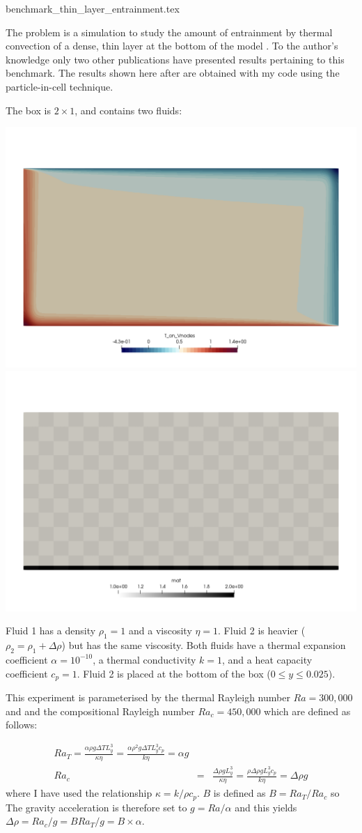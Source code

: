 \begin{flushright} {\tiny {\color{gray} benchmark\_thin\_layer\_entrainment.tex}} \end{flushright}

The problem is a simulation to study the
amount of entrainment by thermal convection of a dense,
thin layer at the bottom of the model \cite{vaks97}. 
To the author's knowledge only two other publications \cite{taki03,vant07}
have presented results pertaining to this benchmark.
The results shown here after are obtained with my \elefant code using 
the particle-in-cell technique. 

The box is $2\times 1$, and contains two fluids:
\begin{center}
\includegraphics[width=0.45\linewidth]{images/benchmark_thinlayer/temperature_init}
\includegraphics[width=0.45\linewidth]{images/benchmark_thinlayer/mat_init}
\end{center}
Fluid 1 has a density $\rho_1=1$ and a viscosity $\eta=1$.
Fluid 2 is heavier ($\rho_2=\rho_1 + \Delta \rho$) 
but has the same viscosity. 
Both fluids have a thermal expansion coefficient $\alpha=10^{-10}$, a 
thermal conductivity $k=1$, and a heat capacity coefficient $c_p=1$.
Fluid 2 is placed at the bottom of the box ($0\leq y \leq 0.025$).

This experiment is parameterised by the thermal Rayleigh number $Ra=300,000$ and 
and the compositional Rayleigh number $Ra_c=450,000$ which are defined as follows:

\begin{eqnarray}
Ra_T=\frac{\alpha \rho g \Delta T L_y^3}{\kappa \eta}
= \frac{\alpha \rho^2 g \Delta T L_y^3 c_p}{k \eta}
= \alpha g \\
Ra_c&=&\frac{ \Delta \rho g L_y^3}{\kappa \eta}
= \frac{ \rho \Delta \rho g L_y^3 c_p}{k \eta}
= \Delta \rho g
\end{eqnarray}
where I have used the relationship $\kappa=k/\rho c_p$.
$B$ is defined as $B=Ra_T/Ra_c$ so 
The gravity acceleration is therefore set to $g=Ra/\alpha$ and this yields $\Delta \rho=Ra_c/g=B Ra_T/g = B\times \alpha$.

